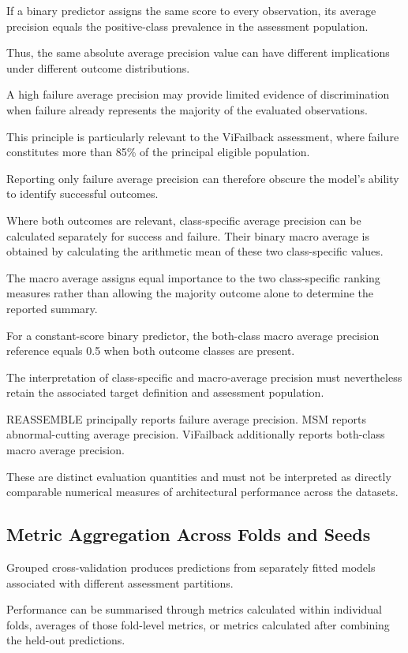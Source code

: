 If a binary predictor assigns the same score to every observation, its average precision equals the positive-class prevalence in the assessment population.

Thus, the same absolute average precision value can have different implications under different outcome distributions.

A high failure average precision may provide limited evidence of discrimination when failure already represents the majority of the evaluated observations.

This principle is particularly relevant to the ViFailback assessment, where failure constitutes more than 85\% of the principal eligible population.

Reporting only failure average precision can therefore obscure the model’s ability to identify successful outcomes.

Where both outcomes are relevant, class-specific average precision can be calculated separately for success and failure. Their binary macro average is obtained by calculating the arithmetic mean of these two class-specific values.

The macro average assigns equal importance to the two class-specific ranking measures rather than allowing the majority outcome alone to determine the reported summary.

For a constant-score binary predictor, the both-class macro average precision reference equals 0.5 when both outcome classes are present.

The interpretation of class-specific and macro-average precision must nevertheless retain the associated target definition and assessment population.

REASSEMBLE principally reports failure average precision. MSM reports abnormal-cutting average precision. ViFailback additionally reports both-class macro average precision.

These are distinct evaluation quantities and must not be interpreted as directly comparable numerical measures of architectural performance across the datasets.

\subsection{Metric Aggregation Across Folds and Seeds}

Grouped cross-validation produces predictions from separately fitted models associated with different assessment partitions.

Performance can be summarised through metrics calculated within individual folds, averages of those fold-level metrics, or metrics calculated after combining the held-out predictions.

